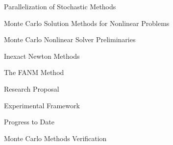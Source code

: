 \documentclass{beamer}
\begin{document}
\begin{frame}{Parallelization of Stochastic Methods}

\end{frame}

\begin{frame}{Monte Carlo Solution Methods for Nonlinear Problems}

\end{frame}

\begin{frame}{Monte Carlo Nonlinear Solver Preliminaries}

\end{frame}

\begin{frame}{Inexact Newton Methods}

\end{frame}

\begin{frame}{The FANM Method}

\end{frame}

\begin{frame}{Research Proposal}

\end{frame}

\begin{frame}{Experimental Framework}

\end{frame}

\begin{frame}{Progress to Date}

\end{frame}

\begin{frame}{Monte Carlo Methods Verification}

\end{frame}
\end{document}
